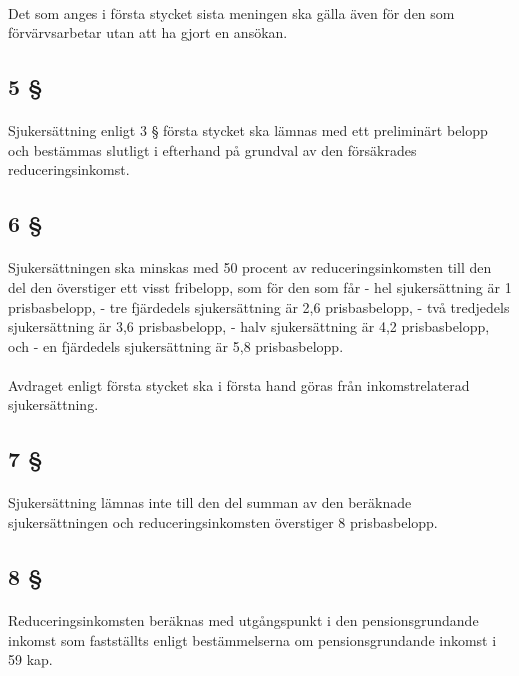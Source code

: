 \documentclass[a4paper,notitlepage,openany,10pt]{book}
\begin{document}
\paragraph*{}
Det som anges i första stycket sista meningen ska gälla även för den som förvärvsarbetar utan att ha gjort en ansökan.
\subsection*{5 §}
\paragraph*{}
Sjukersättning enligt 3 § första stycket ska lämnas med ett preliminärt belopp och bestämmas slutligt i efterhand på grundval av den försäkrades reduceringsinkomst.
\subsection*{6 §}
\paragraph*{}
Sjukersättningen ska minskas med 50 procent av reduceringsinkomsten till den del den överstiger ett visst fribelopp, som för den som får
\newline - hel sjukersättning är 1 prisbasbelopp, - tre fjärdedels sjukersättning är 2,6 prisbasbelopp,
\newline - två tredjedels sjukersättning är 3,6 prisbasbelopp, - halv sjukersättning är 4,2 prisbasbelopp, och - en fjärdedels sjukersättning är 5,8 prisbasbelopp.
\paragraph*{}
Avdraget enligt första stycket ska i första hand göras från inkomstrelaterad sjukersättning.
\subsection*{7 §}
\paragraph*{}
Sjukersättning lämnas inte till den del summan av den beräknade sjukersättningen och reduceringsinkomsten överstiger 8 prisbasbelopp.
\subsection*{8 §}
\paragraph*{}
Reduceringsinkomsten beräknas med utgångspunkt i den pensionsgrundande inkomst som fastställts enligt bestämmelserna om pensionsgrundande inkomst i 59 kap.
\end{document}
